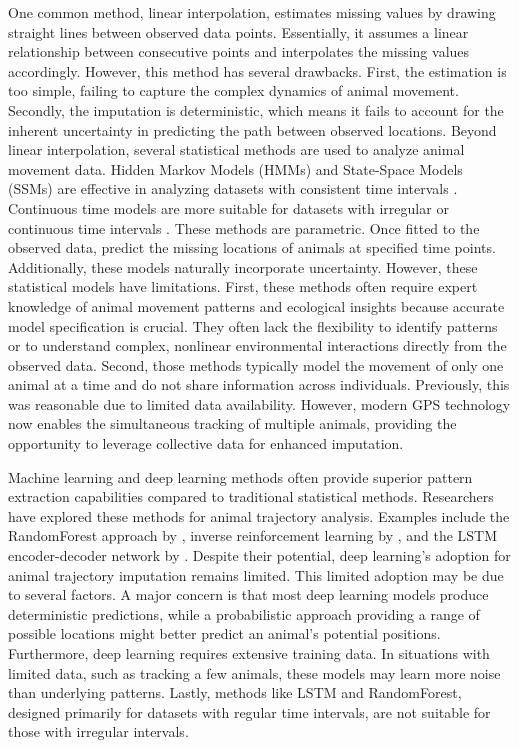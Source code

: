 \documentclass[11pt]{article}
\begin{document}
One common method, linear interpolation, estimates missing values by drawing straight lines between observed data points. Essentially, it assumes a linear relationship between consecutive points and interpolates the missing values accordingly.
 However, this method has several drawbacks. First, the estimation is too simple, failing to capture the complex dynamics of animal movement. Secondly, the imputation is deterministic, which means it fails to account for the inherent uncertainty in predicting the path between observed locations.
 Beyond linear interpolation, several statistical methods are used to analyze animal movement data. Hidden Markov Models (HMMs) 
and State-Space Models (SSMs) are effective in analyzing datasets with consistent time intervals
\citep{holzmann2006hidden, patterson2009classifying, mckellar2015using, towner2016sex, breed2012state}. 
 Continuous time models are more suitable for datasets with irregular or continuous time intervals
\citep{johnson2008continuous, buderman2016functional}. These methods are parametric. Once fitted to the observed data, predict the missing locations of animals at specified time points. Additionally, these models naturally incorporate uncertainty. However, these statistical models have limitations. First, these methods often require expert knowledge of animal movement patterns and ecological insights because accurate model specification is crucial. They often lack the flexibility to identify patterns or to understand complex, nonlinear environmental interactions directly from the observed data. Second, those methods typically model the movement of only one animal at a time and do not share information across individuals. Previously, this was reasonable due to limited data availability. However, modern GPS technology now enables the simultaneous tracking of multiple animals, providing the opportunity to leverage collective data for enhanced imputation.

Machine learning and deep learning methods often provide superior pattern extraction capabilities compared to traditional statistical methods. Researchers have explored these methods for animal trajectory analysis. Examples include the RandomForest approach by \citet{rew2019animal}, inverse reinforcement learning by \citet{hirakawa2018can}, and the LSTM encoder-decoder network by \citet{li2021prediction}. Despite their potential, deep learning's adoption for animal trajectory imputation remains limited. This limited adoption may be due to several factors. A major concern is that most deep learning models produce deterministic predictions, while a probabilistic approach providing a range of possible locations might better predict an animal's potential positions. Furthermore, deep learning requires extensive training data. In situations with limited data, such as tracking a few animals, these models may learn more noise than underlying patterns. Lastly, methods like LSTM and RandomForest, designed primarily for datasets with regular time intervals, are not suitable for those with irregular intervals.
\end{document}
